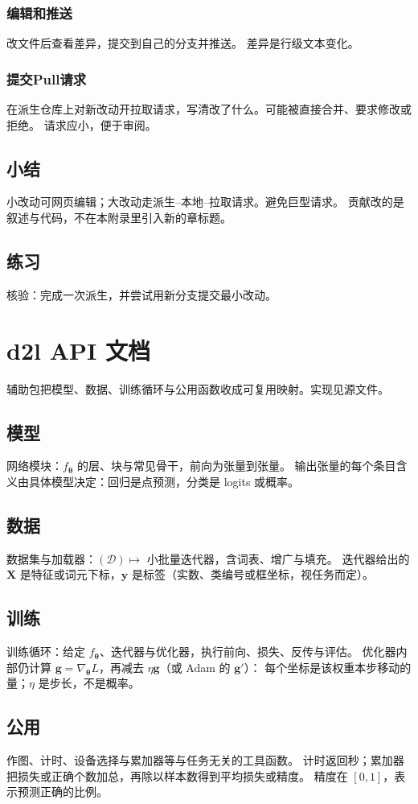 \subsubsection{编辑和推送}

改文件后查看差异，提交到自己的分支并推送。
差异是行级文本变化。

\subsubsection{提交Pull请求}

在派生仓库上对新改动开拉取请求，写清改了什么。可能被直接合并、要求修改或拒绝。
请求应小，便于审阅。

\subsection{小结}

小改动可网页编辑；大改动走派生–本地–拉取请求。避免巨型请求。
贡献改的是叙述与代码，不在本附录里引入新的章标题。

\subsection{练习}

核验：完成一次派生，并尝试用新分支提交最小改动。

\section{d2l API 文档}

辅助包把模型、数据、训练循环与公用函数收成可复用映射。实现见源文件。

\subsection{模型}

网络模块：$f_{\bm{\theta}}$ 的层、块与常见骨干，前向为张量到张量。
输出张量的每个条目含义由具体模型决定：回归是点预测，分类是 logits 或概率。

\subsection{数据}

数据集与加载器：$(\mathcal{D})\mapsto$ 小批量迭代器，含词表、增广与填充。
迭代器给出的 $\bm{X}$ 是特征或词元下标，$\bm{y}$ 是标签（实数、类编号或框坐标，视任务而定）。

\subsection{训练}

训练循环：给定 $f_{\bm{\theta}}$、迭代器与优化器，执行前向、损失、反传与评估。
优化器内部仍计算 $\bm{g}=\nabla_{\bm{\theta}}L$，再减去 $\eta\bm{g}$（或 Adam 的 $\bm{g}'$）：
每个坐标是该权重本步移动的量；$\eta$ 是步长，不是概率。

\subsection{公用}

作图、计时、设备选择与累加器等与任务无关的工具函数。
计时返回秒；累加器把损失或正确个数加总，再除以样本数得到平均损失或精度。
精度在 $[0,1]$，表示预测正确的比例。
